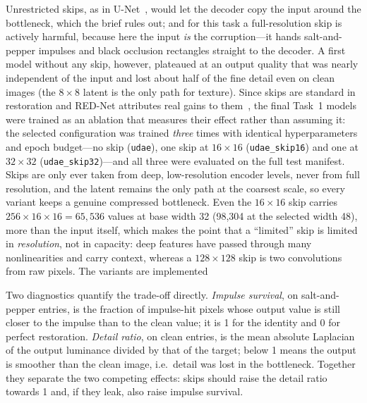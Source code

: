 \documentclass[conference]{IEEEtran}
\begin{document}
Unrestricted skips, as in U-Net~\cite{ronneberger2015unet}, would let the decoder
copy the input around the bottleneck, which the brief rules out; and for this task
a full-resolution skip is actively harmful, because here the input \emph{is} the
corruption---it hands salt-and-pepper impulses and black occlusion rectangles
straight to the decoder. A first model without any skip, however, plateaued at an
output quality that was nearly independent of the input and lost about half of the
fine detail even on clean images (the $8\times8$ latent is the only path for
texture). Since skips are standard in restoration and RED-Net attributes real gains
to them~\cite{mao2016image}, the final Task~1 models were trained as an ablation
that measures their effect rather than assuming it: the selected configuration was
trained \emph{three} times with identical hyperparameters and epoch budget---no skip
(\texttt{udae}), one skip at $16\times16$ (\texttt{udae\_skip16}) and one at
$32\times32$ (\texttt{udae\_skip32})---and all three were evaluated on the full test
manifest. Skips are only ever taken from deep, low-resolution encoder levels, never
from full resolution, and the latent remains the only path at the coarsest scale, so
every variant keeps a genuine compressed bottleneck. Even the $16\times16$ skip carries
$256 \times 16 \times 16 = 65{,}536$ values at base width 32 (98{,}304 at the
selected width 48), more than the input itself, which makes the point that a
``limited'' skip is limited in \emph{resolution}, not in capacity: deep features
have passed through many nonlinearities and carry context, whereas a
$128\times128$ skip is two convolutions from raw pixels. The variants are
implemented

Two diagnostics quantify the trade-off directly. \emph{Impulse survival}, on
salt-and-pepper entries, is the fraction of impulse-hit pixels whose output
value is still closer to the impulse than to the clean value; it is 1 for the
identity and 0 for perfect restoration. \emph{Detail ratio}, on clean entries, is
the mean absolute Laplacian of the output luminance divided by that of the
target; below 1 means the output is smoother than the clean image, i.e.\ detail
was lost in the bottleneck. Together they separate the two competing effects:
skips should raise the detail ratio towards 1 and, if they leak, also raise
impulse survival.
\end{document}

